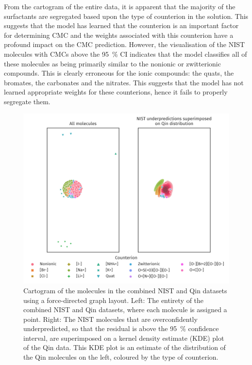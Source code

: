From the cartogram of the entire data, it is apparent that the majority of the
surfactants are segregated based upon the type of counterion in the solution.
This suggests that the model has learned that the counterion is an important
factor for determining CMC and the weights associated with this counterion have
a profound impact on the CMC prediction. However, the visualisation of the NIST
molecules with CMCs above the \SI{95}{\%} CI indicates that the model classifies
all of these molecules as being primarily similar to the nonionic or
zwitterionic compounds. This is clearly erroneous for the ionic compounds: the
quats, the bromates, the carbonates and the nitrates. This suggests that the
model has not learned appropriate weights for these counterions, hence it fails
to properly segregate them.

\begin{figure}
    \includegraphics[width=\textwidth]{images/force-graph.pdf}
    \caption{Cartogram of the molecules in the combined NIST and Qin datasets
        using a force-directed graph layout. Left: The entirety of the combined
        NIST and Qin datasets, where each molecule is assigned a point. Right:
        The NIST molecules that are overconfidently underpredicted, so that the
        residual is above the \SI{95}{\%} confidence interval, are superimposed
        on a kernel density estimate (KDE) plot of the Qin data. This KDE plot
        is an estimate of the distribution of the Qin molecules on the left,
        coloured by the type of counterion.}
    \label{fig:fdg}
\end{figure}

